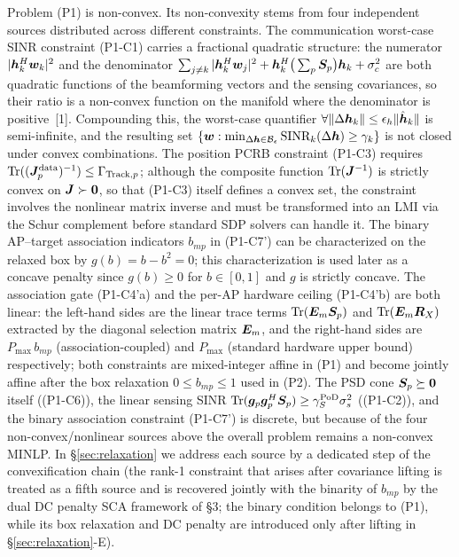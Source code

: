 Problem (P1) is non-convex. Its non-convexity stems from four independent sources distributed across different constraints. The communication worst-case SINR constraint (P1-C1) carries a fractional quadratic structure: the numerator $|\bm{h}_k^H \bm{w}_k|^2$ and the denominator $\sum_{j \neq k} |\bm{h}_k^H \bm{w}_j|^2 + \bm{h}_k^H \big(\sum_p \bm{S}_p\big) \bm{h}_k + \sigma_c^2$ are both quadratic functions of the beamforming vectors and the sensing covariances, so their ratio is a non-convex function on the manifold where the denominator is positive~[1]. Compounding this, the worst-case quantifier $\forall \|\Delta\bm{h}_k\| \leq \epsilon_h \|\hat{\bm{h}}_k\|$ is semi-infinite, and the resulting set $\{\bm{w} : \min_{\Delta\bm{h} \in \mathcal{B}_\epsilon} \text{SINR}_k(\Delta\bm{h}) \geq \gamma_k\}$ is not closed under convex combinations. The position PCRB constraint (P1-C3) requires $\operatorname{Tr}((\bm{J}_p^{\text{data}})^{-1}) \leq \Gamma_{\text{Track}, p}$; although the composite function $\operatorname{Tr}(\bm{J}^{-1})$ is strictly convex on $\bm{J} \succ \bm{0}$, so that (P1-C3) itself defines a convex set, the constraint involves the nonlinear matrix inverse and must be transformed into an LMI via the Schur complement before standard SDP solvers can handle it. The binary AP--target association indicators $b_{mp}$ in (P1-C7') can be characterized on the relaxed box by $g(b)=b-b^2=0$; this characterization is used later as a concave penalty since $g(b) \geq 0$ for $b \in [0,1]$ and $g$ is strictly concave. The association gate (P1-C4'a) and the per-AP hardware ceiling (P1-C4'b) are both linear: the left-hand sides are the linear trace terms $\operatorname{Tr}(\bm{E}_m \bm{S}_p)$ and $\operatorname{Tr}(\bm{E}_m \bm{R}_X)$ extracted by the diagonal selection matrix $\bm{E}_m$, and the right-hand sides are $P_{\max} \, b_{mp}$ (association-coupled) and $P_{\max}$ (standard hardware upper bound) respectively; both constraints are mixed-integer affine in (P1) and become jointly affine after the box relaxation $0 \le b_{mp} \le 1$ used in (P2). The PSD cone $\bm{S}_p \succeq \bm{0}$ itself ((P1-C6)), the linear sensing SINR $\operatorname{Tr}(\bm{g}_p \bm{g}_p^H \bm{S}_p) \geq \gamma_S^{\text{PoD}} \sigma_s^2$ ((P1-C2)), and the binary association constraint (P1-C7') is discrete, but because of the four non-convex/nonlinear sources above the overall problem remains a non-convex MINLP. In \S\ref{sec:relaxation} we address each source by a dedicated step of the convexification chain (the rank-1 constraint that arises after covariance lifting is treated as a fifth source and is recovered jointly with the binarity of $b_{mp}$ by the dual DC penalty SCA framework of \S3; the binary condition belongs to (P1), while its box relaxation and DC penalty are introduced only after lifting in \S\ref{sec:relaxation}-E).

